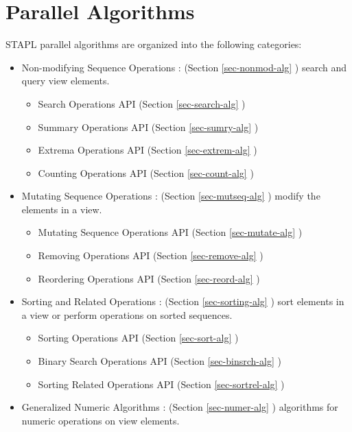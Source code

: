 \chapter{Parallel Algorithms}

STAPL parallel algorithms are organized into the following categories:

\begin{itemize}
\item
Non-modifying Sequence Operations : (Section \ref{sec-nonmod-alg} )
\newline
search and query view elements.

\begin{itemize}
\item
Search Operations API (Section \ref{sec-search-alg} )
\item
Summary Operations API (Section \ref{sec-sumry-alg} )
\item
Extrema Operations API (Section \ref{sec-extrem-alg} )
\item
Counting Operations API (Section \ref{sec-count-alg} )
\end{itemize}

\item
Mutating Sequence Operations : (Section \ref{sec-mutseq-alg} )
\newline
modify the elements in a view.

\begin{itemize}
\item
Mutating Sequence Operations API (Section \ref{sec-mutate-alg} )
\item
Removing Operations API (Section \ref{sec-remove-alg} )
\item
Reordering Operations API (Section \ref{sec-reord-alg} )
\end{itemize}

\item
Sorting and Related Operations : (Section \ref{sec-sorting-alg} )
\newline
sort elements in a view or perform operations on sorted sequences.

\begin{itemize}
\item
Sorting Operations API (Section \ref{sec-sort-alg} )
\item
Binary Search Operations API (Section \ref{sec-binsrch-alg} )
\item
Sorting Related Operations API (Section \ref{sec-sortrel-alg} )
\end{itemize}

\item
Generalized Numeric Algorithms : (Section \ref{sec-numer-alg} )
\newline
algorithms for numeric operations on view elements.

\end{itemize}

